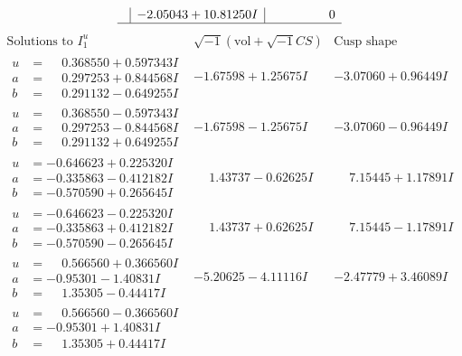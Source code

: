 \documentclass[1p]{elsarticle_modified}
\theoremstyle{definition}
\newcommand{\I}{\sqrt{-1}}
\begin{document}
$$\begin{array}{c|c|c}
 & -2.05043 + 10.81250 I & \phantom{-0.000000 } 0\\
 \hline 
 \end{array}$$\newpage$$\begin{array}{c|c|c}  
\text{Solutions to }I^u_{1}& \I (\text{vol} + \sqrt{-1}CS) & \text{Cusp shape}\\
 \hline 
\begin{aligned}
u &= \phantom{-}0.368550 + 0.597343 I \\
a &= \phantom{-}0.297253 + 0.844568 I \\
b &= \phantom{-}0.291132 - 0.649255 I\end{aligned}
 & -1.67598 + 1.25675 I & -3.07060 + 0.96449 I \\ \hline\begin{aligned}
u &= \phantom{-}0.368550 - 0.597343 I \\
a &= \phantom{-}0.297253 - 0.844568 I \\
b &= \phantom{-}0.291132 + 0.649255 I\end{aligned}
 & -1.67598 - 1.25675 I & -3.07060 - 0.96449 I \\ \hline\begin{aligned}
u &= -0.646623 + 0.225320 I \\
a &= -0.335863 - 0.412182 I \\
b &= -0.570590 + 0.265645 I\end{aligned}
 & \phantom{-}1.43737 - 0.62625 I & \phantom{-}7.15445 + 1.17891 I \\ \hline\begin{aligned}
u &= -0.646623 - 0.225320 I \\
a &= -0.335863 + 0.412182 I \\
b &= -0.570590 - 0.265645 I\end{aligned}
 & \phantom{-}1.43737 + 0.62625 I & \phantom{-}7.15445 - 1.17891 I \\ \hline\begin{aligned}
u &= \phantom{-}0.566560 + 0.366560 I \\
a &= -0.95301 - 1.40831 I \\
b &= \phantom{-}1.35305 - 0.44417 I\end{aligned}
 & -5.20625 - 4.11116 I & -2.47779 + 3.46089 I \\ \hline\begin{aligned}
u &= \phantom{-}0.566560 - 0.366560 I \\
a &= -0.95301 + 1.40831 I \\
b &= \phantom{-}1.35305 + 0.44417 I\end{aligned}

\end{array}$$
\end{document}
